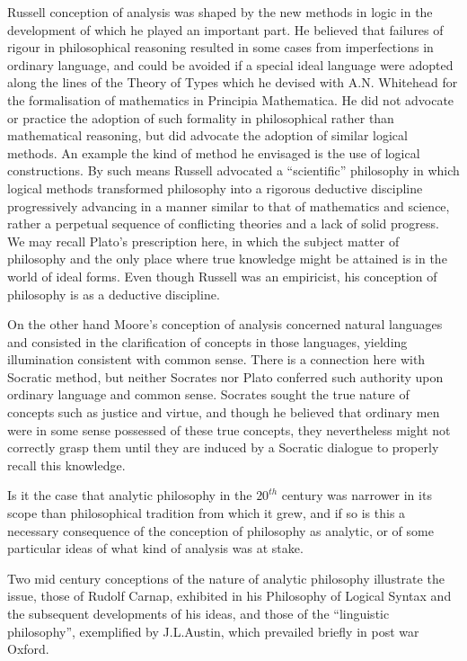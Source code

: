 Russell conception of analysis was shaped by the new methods in logic
in the development of which he played an important part.
He believed that failures of rigour in philosophical reasoning
resulted in some cases from imperfections in ordinary language, and
could be avoided if a special ideal language were adopted along the
lines of the Theory of Types which he devised with A.N. Whitehead
 for the formalisation of mathematics in
Principia Mathematica.
He did not advocate or practice the adoption of such formality in
philosophical rather than mathematical reasoning, but did advocate the
adoption of similar logical methods.
An example the kind of method he envisaged is the use of logical
constructions.
By such means Russell advocated a ``scientific'' philosophy in which
logical methods transformed philosophy into a rigorous deductive
discipline progressively advancing in a manner similar to that of
mathematics and science, rather a perpetual sequence of conflicting
theories and a lack of solid progress.
We may recall Plato's prescription here, in which the subject matter
of philosophy and the only place where true knowledge might be
attained is in the world of ideal forms.
Even though Russell was an empiricist, his conception of philosophy is
as a deductive discipline.

On the other hand Moore's conception of analysis concerned natural
languages and consisted in the clarification of
concepts in those languages, yielding illumination consistent with
common sense.
There is a connection here with Socratic method, but neither Socrates
nor Plato conferred such authority upon ordinary language and common
sense.
Socrates sought the true nature of concepts such as justice and
virtue, and though he believed that ordinary men were in some sense
possessed of these true concepts, they nevertheless might not correctly
grasp them until they are induced by a Socratic dialogue to properly
recall this knowledge.

Is it the case that analytic philosophy in the $20^{th}$ century was
narrower in its scope than philosophical tradition from which it grew,
and if so is this a necessary consequence of the conception of
philosophy as analytic, or of some particular ideas of what kind of
analysis was at stake.

Two mid century conceptions of the nature of analytic philosophy
illustrate the issue, those of Rudolf Carnap, exhibited in his
Philosophy of Logical Syntax and the subsequent developments of his
ideas, and those of the ``linguistic philosophy'', exemplified by
J.L.Austin, which prevailed briefly in post war Oxford.

